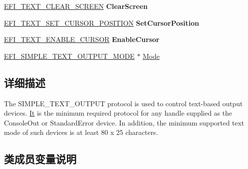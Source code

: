 \begin{DoxyCompactItemize}
\item 
\mbox{\label{struct___e_f_i___s_i_m_p_l_e___t_e_x_t___o_u_t_p_u_t___p_r_o_t_o_c_o_l_a8da6036db26c38e5d5de85bcb7b392d3}} 
\hyperlink{_simple_text_out_8h_acce4dcca5647b886883b9c933823e46d}{E\+F\+I\+\_\+\+T\+E\+X\+T\+\_\+\+C\+L\+E\+A\+R\+\_\+\+S\+C\+R\+E\+EN} {\bfseries Clear\+Screen}
\item 
\mbox{\label{struct___e_f_i___s_i_m_p_l_e___t_e_x_t___o_u_t_p_u_t___p_r_o_t_o_c_o_l_abeff296e64fdfaef298a082835204a7f}} 
\hyperlink{_simple_text_out_8h_a6361e2cdffe9e3cc1544626143980b94}{E\+F\+I\+\_\+\+T\+E\+X\+T\+\_\+\+S\+E\+T\+\_\+\+C\+U\+R\+S\+O\+R\+\_\+\+P\+O\+S\+I\+T\+I\+ON} {\bfseries Set\+Cursor\+Position}
\item 
\mbox{\label{struct___e_f_i___s_i_m_p_l_e___t_e_x_t___o_u_t_p_u_t___p_r_o_t_o_c_o_l_a141e81811bdd71e0e0c0526d978c0b19}} 
\hyperlink{_simple_text_out_8h_a51b6a6139782d14f785387281f1a5fb0}{E\+F\+I\+\_\+\+T\+E\+X\+T\+\_\+\+E\+N\+A\+B\+L\+E\+\_\+\+C\+U\+R\+S\+OR} {\bfseries Enable\+Cursor}
\item 
\hyperlink{struct_e_f_i___s_i_m_p_l_e___t_e_x_t___o_u_t_p_u_t___m_o_d_e}{E\+F\+I\+\_\+\+S\+I\+M\+P\+L\+E\+\_\+\+T\+E\+X\+T\+\_\+\+O\+U\+T\+P\+U\+T\+\_\+\+M\+O\+DE} $\ast$ \hyperlink{struct___e_f_i___s_i_m_p_l_e___t_e_x_t___o_u_t_p_u_t___p_r_o_t_o_c_o_l_ac25211e5f841f91444e352b6ca4e5963}{Mode}
\end{DoxyCompactItemize}


\subsection{详细描述}
The S\+I\+M\+P\+L\+E\+\_\+\+T\+E\+X\+T\+\_\+\+O\+U\+T\+P\+UT protocol is used to control text-\/based output devices. \hyperlink{class_it}{It} is the minimum required protocol for any handle supplied as the Console\+Out or Standard\+Error device. In addition, the minimum supported text mode of such devices is at least 80 x 25 characters. 

\subsection{类成员变量说明}
\mbox{\label{struct___e_f_i___s_i_m_p_l_e___t_e_x_t___o_u_t_p_u_t___p_r_o_t_o_c_o_l_ac25211e5f841f91444e352b6ca4e5963}} 

